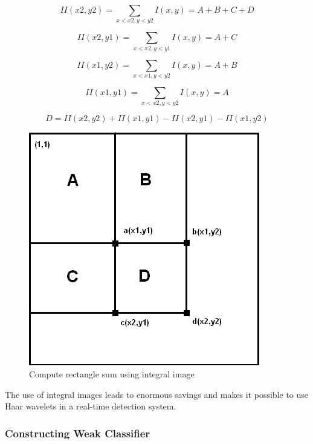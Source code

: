 \documentclass[12pt, twoside]{report}
\begin{document}
	\begin{equation}
		II(x2, y2) = \sum_{x<x2, y<y2}{I(x, y)} = A + B + C + D
	\end{equation}

	\begin{equation}
		II(x2, y1) = \sum_{x<x2, y<y1}{I(x, y)} = A + C
	\end{equation}

	\begin{equation}
		II(x1, y2) = \sum_{x<x1, y<y2}{I(x, y)} = A + B
	\end{equation}

	\begin{equation}
		II(x1, y1) = \sum_{x<x2, y<y2}{I(x, y)} = A
	\end{equation}

	\begin{equation}
		D = II(x2, y2) + II(x1, y1) - II(x2, y1) - II(x1, y2)
	\end{equation}

	\newpage
	\begin{figure}
		\centering
		\includegraphics{img/13_1.png}
		\caption{Compute rectangle sum using integral image}
		\label{fig:29}
	\end{figure}
	
	\par
	The use of integral images leads to enormous savings and makes it possible to use Haar
	wavelets in a real-time detection system.
	\subsubsection{Constructing Weak Classifier}
	
\end{document}
